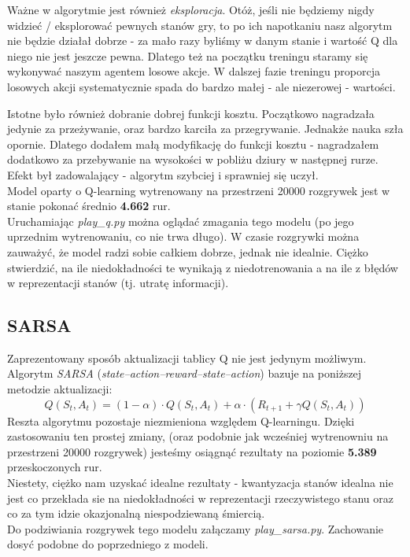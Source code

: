 \documentclass[12pt, A4]{article}
\begin{document}
	Ważne w algorytmie jest również \textit{eksploracja}. Otóż, jeśli nie będziemy nigdy widzieć / eksplorować pewnych stanów gry, to po ich napotkaniu nasz algorytm nie będzie działał dobrze - za mało razy byliśmy w danym stanie i wartość Q dla niego nie jest jeszcze pewna. Dlatego też na początku treningu staramy się wykonywać naszym agentem losowe akcje. W dalszej fazie treningu proporcja losowych akcji systematycznie spada do bardzo małej - ale niezerowej - wartości.    

	Istotne było również dobranie dobrej funkcji kosztu. Początkowo nagradzała jedynie za przeżywanie, oraz bardzo karciła za przegrywanie. Jednakże nauka szła opornie. Dlatego dodałem małą modyfikację do funkcji kosztu - nagradzałem dodatkowo za przebywanie na wysokości w pobliżu dziury w następnej rurze. Efekt był zadowalający - algorytm szybciej i sprawniej się uczył. \\
	Model oparty o Q-learning wytrenowany na przestrzeni 20000 rozgrywek jest w stanie pokonać średnio \textbf{4.662} rur.	\\
	Uruchamiając \textit{play\_q.py} można oglądać zmagania tego modelu (po jego uprzednim wytrenowaniu, co nie trwa długo). W czasie rozgrywki można zauważyć, że model radzi sobie całkiem dobrze, jednak nie idealnie. Ciężko stwierdzić, na ile niedokładności te wynikają z niedotrenowania a na ile z błędów w reprezentacji stanów (tj. utratę informacji). 

	\subsection{SARSA}
	Zaprezentowany sposób aktualizacji tablicy Q nie jest jedynym możliwym. Algorytm \textit{SARSA} (\textit{state–action–reward–state–action}) bazuje na poniższej metodzie aktualizacji:
	\[	Q(S_t, A_t) = (1-\alpha)\cdot Q(S_t, A_t) + \alpha \cdot \left( R_{t+1} + \gamma Q(S_t, A_t) \right)	\]
	Reszta algorytmu pozostaje niezmieniona względem Q-learningu. Dzięki zastosowaniu ten prostej zmiany, (oraz podobnie jak wcześniej wytrenowniu na przestrzeni 20000 rozgrywek) jesteśmy osiągnąć rezultaty na poziomie \textbf{5.389} przeskoczonych rur.\\

	Niestety, ciężko nam uzyskać idealne rezultaty - kwantyzacja stanów idealna nie jest co przekłada sie na niedokładności w reprezentacji rzeczywistego stanu oraz co za tym idzie okazjonalną niespodziewaną śmiercią.\\
	Do podziwiania rozgrywek tego modelu załączamy \textit{play\_sarsa.py}. Zachowanie dosyć podobne do poprzedniego z modeli.
\end{document}
